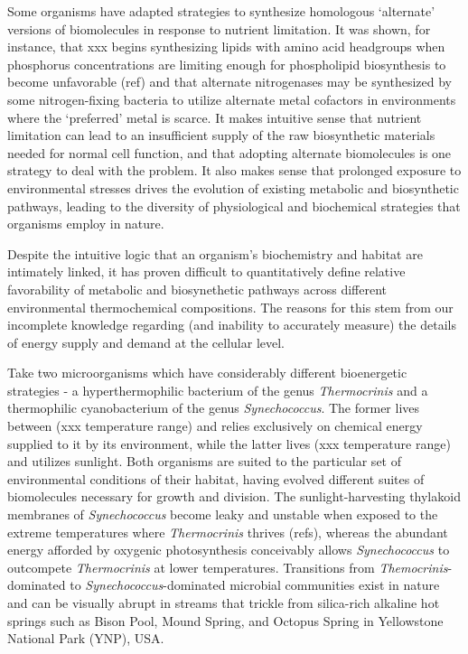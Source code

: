 Some organisms have adapted strategies to synthesize homologous `alternate' versions of biomolecules in response to nutrient limitation. It was shown, for instance, that xxx begins synthesizing lipids with amino acid headgroups when phosphorus concentrations are limiting enough for phospholipid biosynthesis to become unfavorable (ref) and that alternate nitrogenases may be synthesized by some nitrogen-fixing bacteria to utilize alternate metal cofactors in environments where the `preferred' metal is scarce. It makes intuitive sense that nutrient limitation can lead to an insufficient supply of the raw biosynthetic materials needed for normal cell function, and that adopting alternate biomolecules is one strategy to deal with the problem. It also makes sense that prolonged exposure to environmental stresses drives the evolution of existing metabolic and biosynthetic pathways, leading to the diversity of physiological and biochemical strategies that organisms employ in nature.

Despite the intuitive logic that an organism's biochemistry and habitat are intimately linked, it has proven difficult to quantitatively define relative favorability of metabolic and biosynethetic pathways across different environmental thermochemical compositions. The reasons for this stem from our incomplete knowledge regarding (and inability to accurately measure) the details of energy supply and demand at the cellular level.

Take two microorganisms which have considerably different bioenergetic strategies - a hyperthermophilic bacterium of the genus \textit{Thermocrinis} and a thermophilic cyanobacterium of the genus \textit{Synechococcus}. The former lives between (xxx temperature range) and relies exclusively on chemical energy supplied to it by its environment, while the latter lives (xxx temperature range) and utilizes sunlight. Both organisms are suited to the particular set of environmental conditions of their habitat, having evolved different suites of biomolecules necessary for growth and division. The sunlight-harvesting thylakoid membranes of \textit{Synechococcus} become leaky and unstable when exposed to the extreme temperatures where \textit{Thermocrinis} thrives (refs), whereas the abundant energy afforded by oxygenic photosynthesis conceivably allows \textit{Synechococcus} to outcompete \textit{Thermocrinis} at lower temperatures.  Transitions from  \textit{Themocrinis}-dominated to  \textit{Synechococcus}-dominated microbial communities exist in nature and can be visually abrupt in streams that trickle from silica-rich alkaline hot springs such as Bison Pool, Mound Spring, and Octopus Spring in Yellowstone National Park (YNP), USA. 

